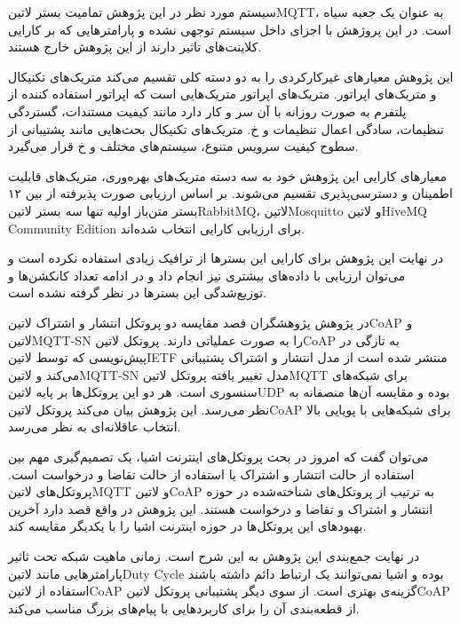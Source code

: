 سیستم مورد نظر در این پژوهش تمامیت بستر ‌لاتین{MQTT}، به عنوان یک جعبه سیاه است. در این پروژهش با اجزای داخل سیستم توجهی نشده و پارامترهایی که بر کارایی
کلاینت‌های تاثیر دارند از این پژوهش خارج هستند.

این پژوهش معیارهای غیرکارکردی را به دو دسته کلی تقسیم می‌کند متریک‌های تکنیکال و متریک‌های اپراتور. متریک‌های اپراتور متریک‌هایی است که اپراتور استفاده کننده از
پلتفرم به صورت روزانه با آن سر و کار دارد مانند کیفیت مستندات، گستردگی تنظیمات، سادگی اعمال تنظیمات و ‌خ. متریک‌های تکنیکال بحث‌هایی مانند پشتیبانی از سطوح
کیفیت سرویس متنوع، سیستم‌های مختلف و ‌خ قرار می‌گیرد.

معیارهای کارایی این پژوهش خود به سه دسته متریک‌های بهره‌وری، متریک‌های قابلیت اطمینان و دسترسی‌پذیری تقسیم می‌شوند.
بر اساس ارزیابی صورت پذیرفته از بین ۱۲ بستر متن‌باز اولیه تنها سه بستر ‌لاتین{RabbitMQ}، ‌لاتین{Mosquitto} و ‌لاتین{HiveMQ Community Edition}
برای ارزیابی کارایی انتخاب شده‌اند.

در نهایت این پژوهش برای کارایی این بسترها
از ترافیک زیادی استفاده نکرده است و می‌توان ارزیابی با داده‌های بیشتری نیز انجام داد و در ادامه تعداد کانکشن‌ها و توزیع‌شدگی این بسترها در نظر گرفته نشده است.


در پژوهش  پژوهشگران قصد مقایسه دو پروتکل انتشار و اشتراک ‌لاتین{CoAP} و ‌لاتین{MQTT-SN} را به صورت عملیاتی دارند.
پروتکل ‌لاتین{CoAP} به تازگی در پیش‌نویسی که توسط ‌لاتین{IETF} منتشر شده است از مدل انتشار و اشتراک پشتیبانی می‌کند و ‌لاتین{MQTT-SN}
مدل تغییر یافته پروتکل ‌لاتین{MQTT} برای شبکه‌های سنسوری است. هر دو این پروتکل‌ها بر پایه ‌لاتین{UDP} بوده و مقایسه آن‌ها منصفانه به نظر می‌رسد.
این پژوهش بیان می‌کند پروتکل ‌لاتین{CoAP} برای شبکه‌هایی با پویایی بالا انتخاب عاقلانه‌ای به نظر می‌رسد.

می‌توان گفت که امروز در بحث پروتکل‌های اینترنت اشیا، یک تصمیم‌گیری مهم بین استفاده از حالت انتشار و اشتراک یا استفاده از حالت تقاضا و درخواست است.
پروتکل‌های ‌لاتین{MQTT} و ‌لاتین{CoAP} به ترتیب از پروتکل‌های شناخته‌شده در حوزه انتشار و اشتراک و تقاضا و درخواست هستند.
این پژوهش در واقع قصد دارد آخرین بهبودهای این پروتکل‌ها در حوزه اینترنت اشیا را با یکدیگر مقایسه کند.

در نهایت جمع‌بندی این پژوهش به این شرح است. زمانی ماهیت شبکه تحت ثاثیر پارامترهایی مانند ‌لاتین{Duty Cycle} بوده
و اشیا نمی‌توانند یک ارتباط دائم داشته باشند استفاده از ‌لاتین{CoAP} گزینه‌ی بهتری است. از سوی دیگر پشتیبانی پروتکل
‌لاتین{CoAP} از قطعه‌بندی آن را برای کاربردهایی با پیام‌های بزرگ مناسب می‌کند.

